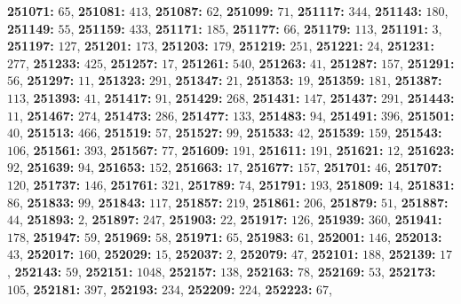 \textsf{\bfseries 251071:} $65$, \textsf{\bfseries 251081:} $413$, \textsf{\bfseries 251087:} $62$, \textsf{\bfseries 251099:} $71$, \textsf{\bfseries 251117:} $344$, \textsf{\bfseries 251143:} $180$, \textsf{\bfseries 251149:} $55$, \textsf{\bfseries 251159:} $433$, \textsf{\bfseries 251171:} $185$, \textsf{\bfseries 251177:} $66$, \textsf{\bfseries 251179:} $113$, \textsf{\bfseries 251191:} $3$, \textsf{\bfseries 251197:} $127$, \textsf{\bfseries 251201:} $173$, \textsf{\bfseries 251203:} $179$, \textsf{\bfseries 251219:} $251$, \textsf{\bfseries 251221:} $24$, \textsf{\bfseries 251231:} $277$, \textsf{\bfseries 251233:} $425$, \textsf{\bfseries 251257:} $17$, \textsf{\bfseries 251261:} $540$, \textsf{\bfseries 251263:} $41$, \textsf{\bfseries 251287:} $157$, \textsf{\bfseries 251291:} $56$, \textsf{\bfseries 251297:} $11$, \textsf{\bfseries 251323:} $291$, \textsf{\bfseries 251347:} $21$, \textsf{\bfseries 251353:} $19$, \textsf{\bfseries 251359:} $181$, \textsf{\bfseries 251387:} $113$, \textsf{\bfseries 251393:} $41$, \textsf{\bfseries 251417:} $91$, \textsf{\bfseries 251429:} $268$, \textsf{\bfseries 251431:} $147$, \textsf{\bfseries 251437:} $291$, \textsf{\bfseries 251443:} $11$, \textsf{\bfseries 251467:} $274$, \textsf{\bfseries 251473:} $286$, \textsf{\bfseries 251477:} $133$, \textsf{\bfseries 251483:} $94$, \textsf{\bfseries 251491:} $396$, \textsf{\bfseries 251501:} $40$, \textsf{\bfseries 251513:} $466$, \textsf{\bfseries 251519:} $57$, \textsf{\bfseries 251527:} $99$, \textsf{\bfseries 251533:} $42$, \textsf{\bfseries 251539:} $159$, \textsf{\bfseries 251543:} $106$, \textsf{\bfseries 251561:} $393$, \textsf{\bfseries 251567:} $77$, \textsf{\bfseries 251609:} $191$, \textsf{\bfseries 251611:} $191$, \textsf{\bfseries 251621:} $12$, \textsf{\bfseries 251623:} $92$, \textsf{\bfseries 251639:} $94$, \textsf{\bfseries 251653:} $152$, \textsf{\bfseries 251663:} $17$, \textsf{\bfseries 251677:} $157$, \textsf{\bfseries 251701:} $46$, \textsf{\bfseries 251707:} $120$, \textsf{\bfseries 251737:} $146$, \textsf{\bfseries 251761:} $321$, \textsf{\bfseries 251789:} $74$, \textsf{\bfseries 251791:} $193$, \textsf{\bfseries 251809:} $14$, \textsf{\bfseries 251831:} $86$, \textsf{\bfseries 251833:} $99$, \textsf{\bfseries 251843:} $117$, \textsf{\bfseries 251857:} $219$, \textsf{\bfseries 251861:} $206$, \textsf{\bfseries 251879:} $51$, \textsf{\bfseries 251887:} $44$, \textsf{\bfseries 251893:} $2$, \textsf{\bfseries 251897:} $247$, \textsf{\bfseries 251903:} $22$, \textsf{\bfseries 251917:} $126$, \textsf{\bfseries 251939:} $360$, \textsf{\bfseries 251941:} $178$, \textsf{\bfseries 251947:} $59$, \textsf{\bfseries 251969:} $58$, \textsf{\bfseries 251971:} $65$, \textsf{\bfseries 251983:} $61$, \textsf{\bfseries 252001:} $146$, \textsf{\bfseries 252013:} $43$, \textsf{\bfseries 252017:} $160$, \textsf{\bfseries 252029:} $15$, \textsf{\bfseries 252037:} $2$, \textsf{\bfseries 252079:} $47$, \textsf{\bfseries 252101:} $188$, \textsf{\bfseries 252139:} $17$, \textsf{\bfseries 252143:} $59$, \textsf{\bfseries 252151:} $1048$, \textsf{\bfseries 252157:} $138$, \textsf{\bfseries 252163:} $78$, \textsf{\bfseries 252169:} $53$, \textsf{\bfseries 252173:} $105$, \textsf{\bfseries 252181:} $397$, \textsf{\bfseries 252193:} $234$, \textsf{\bfseries 252209:} $224$, \textsf{\bfseries 252223:} $67$, 
